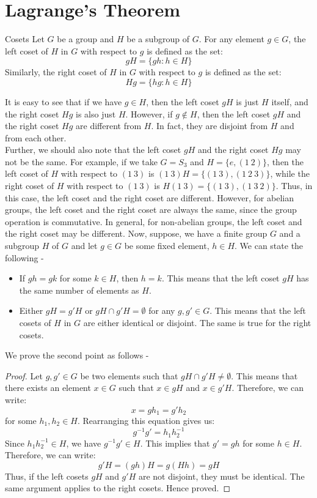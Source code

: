 \documentclass[openany]{book}
\begin{document}
\section{Lagrange's Theorem}
\begin{mydefinition}{Cosets}
    Let \( G \) be a group and \( H \) be a subgroup of \( G \). For any element \( g \in G \), the left coset of \( H \) in \( G \) with respect to \( g \) is defined as the set:
    \[
    gH = \{ gh : h \in H \}
    \]
    Similarly, the right coset of \( H \) in \( G \) with respect to \( g \) is defined as the set:
    \[
    Hg = \{ hg : h \in H \}
    \]
\end{mydefinition}
It is easy to see that if we have $g \in H$, then the left coset $gH$ is just $H$ itself, and the right coset $Hg$ is also just $H$. However, if $g \notin H$, then the left coset $gH$ and the right coset $Hg$ are different from $H$. In fact, they are disjoint from $H$ and from each other. \\
Further, we should also note that the left coset $gH$ and the right coset $Hg$ may not be the same. For example, if we take $G = S_3$ and $H = \{ e, (1\ 2) \}$, then the left coset of $H$ with respect to $(1\ 3)$ is $(1\ 3)H = \{ (1\ 3), (1\ 2\ 3) \}$, while the right coset of $H$ with respect to $(1\ 3)$ is $H(1\ 3) = \{ (1\ 3), (1\ 3\ 2) \}$. Thus, in this case, the left coset and the right coset are different. However, for abelian groups, the left coset and the right coset are always the same, since the group operation is commutative. In general, for non-abelian groups, the left coset and the right coset may be different.
Now, suppose, we have a finite group \( G \) and a subgroup \( H \) of \( G \) and let $g \in G$ be some fixed element, $h \in H$. We can state the following - 
\begin{itemize}
    \item If $gh = gk$ for some $k \in H$, then $h = k$. This means that the left coset $gH$ has the same number of elements as $H$.
    \item Either $gH = g'H$ or $gH \cap g'H = \emptyset$ for any $g, g' \in G$. This means that the left cosets of $H$ in $G$ are either identical or disjoint. The same is true for the right cosets.
\end{itemize}
We prove the second point as follows -
\begin{proof}
    Let \( g, g' \in G \) be two elements such that \( gH \cap g'H \neq \emptyset \). This means that there exists an element \( x \in G \) such that \( x \in gH \) and \( x \in g'H \). Therefore, we can write:
    \[
    x = gh_1 = g'h_2
    \]
    for some \( h_1, h_2 \in H \). Rearranging this equation gives us:
    \[
    g^{-1}g' = h_1 h_2^{-1}
    \]
    Since \( h_1 h_2^{-1} \in H \), we have \( g^{-1}g' \in H \). This implies that \( g' = gh \) for some \( h \in H \). Therefore, we can write:
    \[
    g'H = (gh)H = g(Hh) = gH
    \]
    Thus, if the left cosets \( gH \) and \( g'H \) are not disjoint, they must be identical. The same argument applies to the right cosets. Hence proved.
\end{proof}
\end{document}
